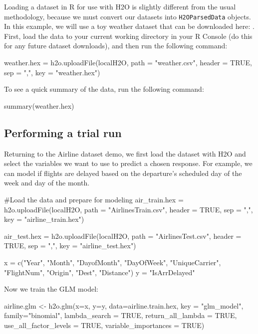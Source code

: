 \documentclass[11pt]{article}
\begin{document}
Loading a dataset in R for use with H2O is slightly different from the usual methodology, because we must convert our datasets into \texttt{H2OParsedData} objects. In this example, we will use a toy weather dataset that can be downloaded here: . First, load the data to your current working directory in your R Console (do this for any future dataset downloads), and then run the following command:
\begin{spverbatim}
weather.hex = h2o.uploadFile(localH2O, path = "weather.csv", header = TRUE, sep = ",", key = "weather.hex")
\end{spverbatim}
\bigskip
\noindent
To see a quick summary of the data, run the following command:
\begin{spverbatim}
summary(weather.hex)
\end{spverbatim}


\subsection{Performing a trial run} \label{3.2}
Returning to the Airline dataset demo, we first load the dataset with H2O and select the variables we want to use to predict a chosen response. For example, we can model if flights are delayed based on the departure's scheduled day of the week and day of the month.
\begin{spverbatim}

#Load the data and prepare for modeling
air_train.hex = h2o.uploadFile(localH2O, path = "AirlinesTrain.csv", header = TRUE, sep = ",", key = "airline_train.hex")

air_test.hex = h2o.uploadFile(localH2O, path = "AirlinesTest.csv", header = TRUE, sep = ",", key = "airline_test.hex")

x = c("Year", "Month", "DayofMonth", "DayOfWeek", "UniqueCarrier", "FlightNum", "Origin", "Dest", "Distance")
y = "IsArrDelayed" 

\end{spverbatim}

Now we train the GLM model:

\begin{spverbatim}
airline.glm <- h2o.glm(x=x, 
                     y=y, 
                     data=airline.train.hex,
                     key = "glm_model",
                     family="binomial",
                     lambda_search = TRUE,
                     return_all_lambda = TRUE,
                     use_all_factor_levels = TRUE,
                     variable_importances = TRUE)
\end{spverbatim}
\end{document}
